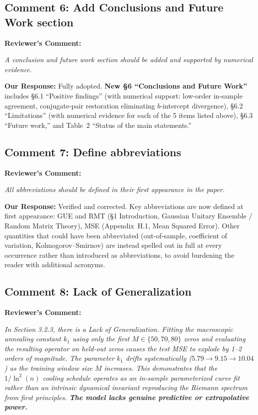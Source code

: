 \documentclass[11pt]{article}
\begin{document}
\subsection*{Comment 6: Add Conclusions and Future Work section}

\noindent\textbf{Reviewer's Comment:}
\begin{quotebox}
\itshape A conclusion and future work section should be added and supported by numerical evidence.
\end{quotebox}

\noindent\textbf{Our Response:} Fully adopted. \textbf{New \S6 ``Conclusions and Future Work''} includes \S6.1 ``Positive findings'' (with numerical support: low-order in-sample agreement, conjugate-pair restoration eliminating $b$-intercept divergence), \S6.2 ``Limitations'' (with numerical evidence for each of the 5 items listed above), \S6.3 ``Future work,'' and Table~2 ``Status of the main statements.''

\subsection*{Comment 7: Define abbreviations}

\noindent\textbf{Reviewer's Comment:}
\begin{quotebox}
\itshape All abbreviations should be defined in their first appearance in the paper.
\end{quotebox}

\noindent\textbf{Our Response:} Verified and corrected. Key abbreviations are now defined at first appearance: GUE and RMT (\S1 Introduction, Gaussian Unitary Ensemble / Random Matrix Theory), MSE (Appendix~H.1, Mean Squared Error). Other quantities that could have been abbreviated (out-of-sample, coefficient of variation, Kolmogorov--Smirnov) are instead spelled out in full at every occurrence rather than introduced as abbreviations, to avoid burdening the reader with additional acronyms.

\subsection*{Comment 8: Lack of Generalization}

\noindent\textbf{Reviewer's Comment:}
\begin{quotebox}
\itshape In Section 3.2.3, there is a Lack of Generalization. Fitting the macroscopic annealing constant $k_1$ using only the first $M \in \{50, 70, 80\}$ zeros and evaluating the resulting operator on held-out zeros causes the test MSE to explode by 1--2 orders of magnitude. The parameter $k_1$ drifts systematically ($5.79 \to 9.15 \to 10.04$) as the training window size $M$ increases. This demonstrates that the $1/\ln^2(n)$ cooling schedule operates as an in-sample parameterized curve fit rather than an intrinsic dynamical invariant reproducing the Riemann spectrum from first principles. \textbf{The model lacks genuine predictive or extrapolative power.}
\end{quotebox}
\end{document}
